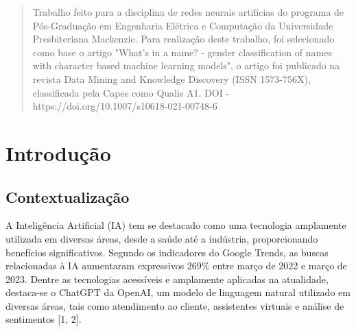 \documentclass[conference,compsoc]{IEEEtran}
\begin{document}




\maketitle

\begin{abstract}
Trabalho feito para a disciplina de redes neurais artificias do programa de Pós-Graduação em Engenharia Elétrica e Computação da Universidade Presbiteriana Mackenzie. Para realização deste trabalho, foi selecionado como base o artigo "What's in a name? - gender classification of names with character based machine learning models", o artigo foi publicado na revista Data Mining and Knowledge Discovery (ISSN 1573-756X), classificada pela Capes como Qualis A1. DOI - https://doi.org/10.1007/s10618-021-00748-6
\end{abstract}





%
\IEEEpeerreviewmaketitle



\section{Introdução}
\subsection{Contextualização}
A Inteligência Artificial (IA) tem se destacado como uma tecnologia amplamente utilizada em diversas áreas, desde a saúde até a indústria, proporcionando benefícios significativos. Segundo os indicadores do Google Trends, as buscas relacionadas à IA aumentaram expressivos 269\% entre março de 2022 e março de 2023. Dentre as tecnologias acessíveis e amplamente aplicadas na atualidade, destaca-se o ChatGPT da OpenAI, um modelo de linguagem natural utilizado em diversas áreas, tais como atendimento ao cliente, assistentes virtuais e análise de sentimentos [1, 2].
\end{document}
